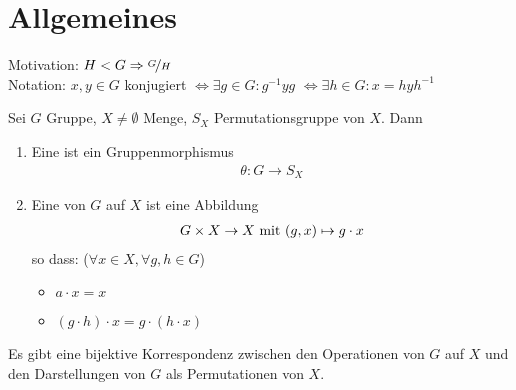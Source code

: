 \section{Allgemeines}
Motivation: $H < G \implies \lnkset{G}{H}$\\
Notation: $x,y \in G$ konjugiert $\Leftrightarrow \exists g \in G \colon g^{-1}yg$ $\Leftrightarrow \exists h \in G\colon x = hyh^{-1}$
\begin{definition}
	Sei $G$ Gruppe, $X \neq \emptyset$ Menge, $S_X$ Permutationsgruppe von $X$. Dann
	\begin{enumerate}
		\item Eine  ist ein Gruppenmorphismus
		\begin{align*}
			\theta\colon G \to S_X
		\end{align*}
		\item Eine  von $G$ auf $X$ ist eine Abbildung
		\begin{align*}
			G\times X \to X \mit (g,x) \mapsto g\cdot x
		\end{align*}
		so dass: ($\forall x \in X, \forall g,h \in G$)
		\begin{itemize}
			\item $a \cdot x = x$
			\item $(g\cdot h)\cdot x = g \cdot (h\cdot x)$
		\end{itemize}
	\end{enumerate}
\end{definition}
\begin{proposition}
	Es gibt eine bijektive Korrespondenz zwischen den Operationen von $G$ auf $X$ und den Darstellungen von $G$ als Permutationen von $X$.
\end{proposition}
